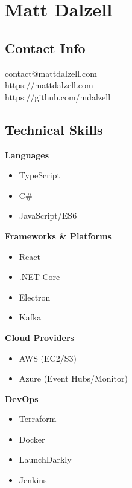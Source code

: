 \documentclass[12pt]{article}
\begin{document}

\section*{Matt Dalzell}

\setlength{\columnsep}{4em}
\setlength{\columnseprule}{0.1pt}
\begin{paracol}{2}

\subsection*{Contact Info}
contact@mattdalzell.com \\ 
https://mattdalzell.com \\
https://github.com/mdalzell 

\subsection*{Technical Skills} 

\textbf{Languages}
\begin{itemize}
    \setlength\itemsep{0em}
    \item {\footnotesize{TypeScript}}
    \item {\footnotesize{C\#}}
    \item {\footnotesize{JavaScript/ES6}}
\end{itemize}

\noindent \textbf{Frameworks \& Platforms}
\begin{itemize}
    \setlength\itemsep{0em}
    \item {\footnotesize{React}}
    \item {\footnotesize{.NET Core}}
    \item {\footnotesize{Electron}}
    \item {\footnotesize{Kafka}}
\end{itemize}

\noindent \textbf{Cloud Providers}
\begin{itemize}
    \setlength\itemsep{0em}
    \item {\footnotesize{AWS (EC2/S3)}}
    \item {\footnotesize{Azure (Event Hubs/Monitor)}}
\end{itemize}

\noindent \textbf{DevOps}
\begin{itemize}
    \setlength\itemsep{0em}
    \item {\footnotesize{Terraform}}
    \item {\footnotesize{Docker}}
    \item {\footnotesize{LaunchDarkly}}
    \item {\footnotesize{Jenkins}}
\end{itemize}


\end{paracol}
\end{document}
